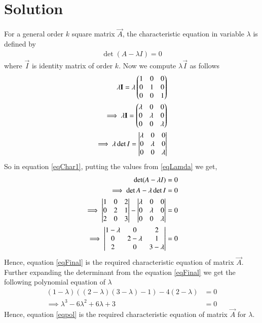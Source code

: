 \documentclass[journal,12pt,twocolumn]{IEEEtran}
\begin{document}
\section{Solution}
For a general order $k$ square matrix $\vec{A}$, the characteristic equation in variable $\lambda$ is defined by
\begin{align}
\det({A-\lambda I}) = 0\label{eqChar1}
\end{align}
where $\vec{I}$ is identity matrix of order $k$. Now we compute $\lambda \vec{I}$ as follows
\begin{align}
\lambda \mathbf{I} = \lambda \begin{pmatrix}1&0&0\\0&1&0\\0&0&1\end{pmatrix}\\
\implies\lambda \mathbf{I} = \begin{pmatrix}\lambda &0&0\\0&\lambda &0\\0&0&\lambda\end{pmatrix}\\
\implies\lambda\det{I} = \begin{vmatrix}\lambda &0&0\\0&\lambda &0\\0&0&\lambda\end{vmatrix}\label{eqLamda}
\end{align}
So in equation \ref{eqChar1}, putting the values from \ref{eqLamda} we get,
\begin{align}
\det({A-\lambda I}) &= 0\\
\implies\det{A}-\lambda \det{I} &= 0\\
\implies\begin{vmatrix}1&0&2\\0&2&1\\2&0&3\end{vmatrix}-\begin{vmatrix}\lambda &0&0\\0&\lambda &0\\0&0&\lambda \end{vmatrix} &= 0\\
\implies\begin{vmatrix}1-\lambda &0&2\\0&2-\lambda &1\\2&0& 3-\lambda\end{vmatrix} &= 0\label{eqFinal}
\end{align}
Hence, equation \ref{eqFinal} is the required characteristic equation of matrix $\vec{A}$. Further expanding the determinant from the equation \ref{eqFinal} we get the following polynomial equation of $\lambda$ 
\begin{align}
(1-\lambda )((2-\lambda)(3-\lambda)-1)-4(2-\lambda) &= 0\\
\implies\lambda^3-6\lambda^2+6\lambda+3 &=0\label{eqpol}
\end{align}
Hence, equation \ref{eqpol} is the required characteristic equation of matrix $\vec{A}$ for $\lambda$.
\end{document}
